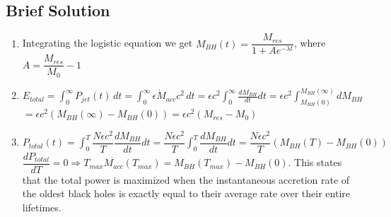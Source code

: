 \documentclass{article}
\begin{document}
\subsection{Brief Solution}
\begin{enumerate}
    \item Integrating the logistic equation we get $M_{BH}(t) = \dfrac{M_{res}}{1+A e^{-\lambda t}}$, where $A = \dfrac{M_{res}}{M_0} - 1$
    \item $ E_{total} = \int_0^\infty P_{jet}(t) \,dt = \int_0^\infty \epsilon \dot{M}_{acc}c^2 \,dt = \epsilon c^2 \int_0^\infty \frac{dM_{BH}}{dt} dt = \epsilon c^2 \int_{M_{BH}(0)}^{M_{BH}(\infty)} dM_{BH}$
        \\ $ = \epsilon c^2 (M_{BH}(\infty) - M_{BH}(0)) = \epsilon c^2 (M_{res} - M_0)$
    \item $ P_{total}(t) = \int_{0}^{T} \dfrac{N \epsilon c^2}{T} \dfrac{dM_{BH}}{dt} dt = \dfrac{N \epsilon c^2}{T} \int_{0}^{T} \dfrac{dM_{BH}}{dt} dt = \dfrac{N \epsilon c^2}{T} (M_{BH}(T) - M_{BH}(0))$
          \\ $\dfrac{dP_{total}}{dT} = 0 \Rightarrow T_{max} \dot{M_{acc}}(T_{max}) = M_{BH}(T_{max}) - M_{BH}(0)$. This states that the total power is maximized when the instantaneous accretion rate of the oldest black holes is exactly equal to their average rate over their entire lifetimes.
\end{enumerate}
\end{document}
